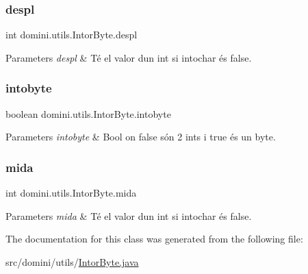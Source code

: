 \subsubsection{\texorpdfstring{despl}{despl}}
{\footnotesize\ttfamily int domini.\+utils.\+Intor\+Byte.\+despl\hspace{0.3cm}{\ttfamily [private]}}


\begin{DoxyParams}{Parameters}
{\em despl} & Té el valor d\textquotesingle{}un int si intochar és false. \\
\hline
\end{DoxyParams}
\mbox{\label{classdomini_1_1utils_1_1IntorByte_aee013881ecae778d25cab7c0b7655528}} 
\subsubsection{\texorpdfstring{intobyte}{intobyte}}
{\footnotesize\ttfamily boolean domini.\+utils.\+Intor\+Byte.\+intobyte\hspace{0.3cm}{\ttfamily [private]}}


\begin{DoxyParams}{Parameters}
{\em intobyte} & Bool on false són 2 int\textquotesingle{}s i true és un byte. \\
\hline
\end{DoxyParams}
\mbox{\label{classdomini_1_1utils_1_1IntorByte_a6dd2ad21efcfb2bcfff716f5e04794d9}} 
\subsubsection{\texorpdfstring{mida}{mida}}
{\footnotesize\ttfamily int domini.\+utils.\+Intor\+Byte.\+mida\hspace{0.3cm}{\ttfamily [private]}}


\begin{DoxyParams}{Parameters}
{\em mida} & Té el valor d\textquotesingle{}un int si intochar és false. \\
\hline
\end{DoxyParams}


The documentation for this class was generated from the following file\+:\begin{DoxyCompactItemize}
\item 
src/domini/utils/\hyperlink{IntorByte_8java}{Intor\+Byte.\+java}\end{DoxyCompactItemize}
